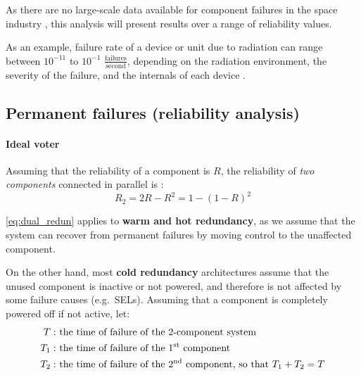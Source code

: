 \documentclass[a4paper,nobib,final]{tufte-book}
\def\acusepage#1{}
\begin{document}
As there are no large-scale data available for component failures in the space industry \autocite{esatec-qqd_effective_reliability_2016}, this analysis will present results over a range of reliability values.

As an example, failure rate of a device or unit due to radiation can range between \(10^{-11}\) to \(10^{-1}\) \(\frac{\text{failures}}{\text{second}}\), depending on the radiation environment, the severity of the failure, and the internals of each device \autocite[158-159]{gupta_analysis_single_2017}.


\subsection{Permanent failures (reliability analysis)}

\paragraph{\textbf{Ideal voter}}\hspace{0pt}
\acusepage{voter}


Assuming that the reliability of a component is \(R\), the reliability of \emph{two components} connected in parallel is \autocite[31]{birolini_reliability_engineering_2004}:
\begin{equation}
R_2 = 2R - R^2 = 1 - (1 - R)^2 \label{eq:dual_redun}
\end{equation}
	
	
\eqref{eq:dual_redun} applies to \textbf{warm and hot redundancy}, as we assume that the system can recover from permanent failures by moving control to the unaffected component.

On the other hand, most \textbf{cold redundancy} architectures assume that the unused component is inactive or not powered, and therefore is not affected by some failure causes (e.g.\ \acsp{SEL}). Assuming that a component is completely powered off if not active, let:
\begin{align*}
T: & \text{ the time of failure of the 2-component system}\\
T_1: & \text{ the time of failure of the 1\textsuperscript{st} component}\\
T_2: & \text{ the time of failure of the 2\textsuperscript{nd} component, so that } T_1 + T_2 = T
\end{align*}
\end{document}
